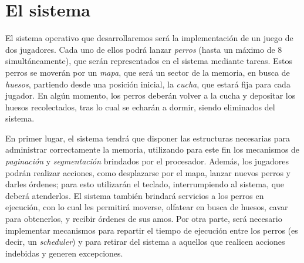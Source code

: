 \section{El sistema}
  
  El sistema operativo que desarrollaremos será la implementación de un juego de dos jugadores. Cada uno de ellos podrá lanzar \emph{perros} (hasta un máximo de 8 simultáneamente), que serán representados en el sistema mediante tareas. Estos perros se moverán por un \emph{mapa}, que será un sector de la memoria, en busca de \emph{huesos}, partiendo desde una posición inicial, la \emph{cucha}, que estará fija para cada jugador. En algún momento, los perros deberán volver a la cucha y depositar los huesos recolectados, tras lo cual se echarán a dormir, siendo eliminados del sistema.
  
  En primer lugar, el sistema tendrá que disponer las estructuras necesarias para administrar correctamente la memoria, utilizando para este fin los mecanismos de \emph{paginación} y \emph{segmentación} brindados por el procesador. Además, los jugadores podrán realizar acciones, como desplazarse por el mapa, lanzar nuevos perros y darles órdenes; para esto utilizarán el teclado, interrumpiendo al sistema, que deberá atenderlos. El sistema también brindará servicios a los perros en ejecución, con lo cual les permitirá moverse, olfatear en busca de huesos, cavar para obtenerlos, y recibir órdenes de sus amos. Por otra parte, será necesario implementar mecanismos para repartir el tiempo de ejecución entre los perros (es decir, un \emph{scheduler}) y para retirar del sistema a aquellos que realicen acciones indebidas y generen excepciones.
